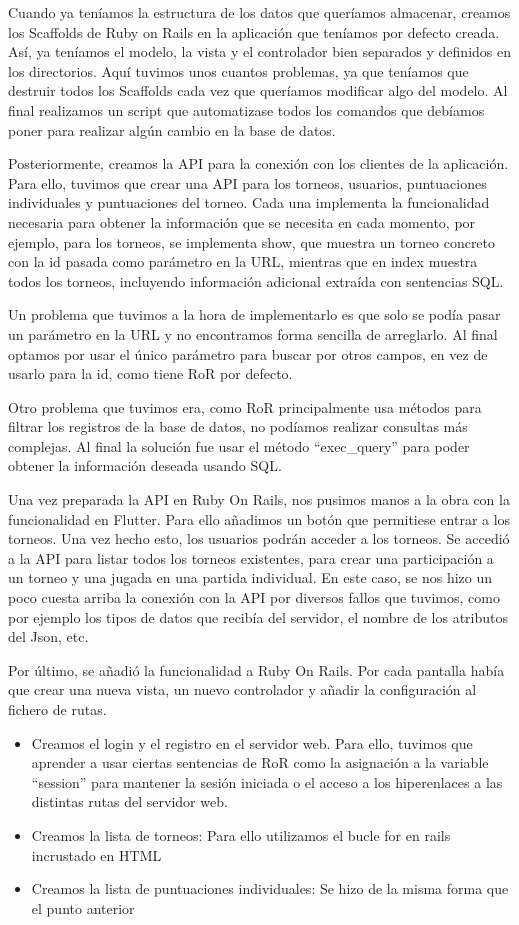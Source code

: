 \documentclass{article}
\begin{document}
Cuando ya teníamos la estructura de los datos que queríamos almacenar, creamos los Scaffolds de Ruby on Rails en la aplicación que teníamos por defecto creada. Así, ya teníamos el 
modelo, la vista y el controlador bien separados y definidos en los directorios. Aquí tuvimos unos cuantos problemas, ya que teníamos que destruir todos los Scaffolds cada vez que queríamos
modificar algo del modelo. Al final realizamos un script que automatizase todos los comandos que debíamos poner para realizar algún cambio en la base de datos.

Posteriormente, creamos la API para la conexión con los clientes de la aplicación. Para ello, tuvimos que crear una API para los torneos, usuarios, puntuaciones individuales y puntuaciones del torneo. Cada una implementa la funcionalidad necesaria para obtener la información que se necesita en cada momento, por ejemplo, para los torneos, se implementa show, que muestra un torneo concreto con la id pasada como parámetro en la URL, mientras que en index muestra todos los torneos, incluyendo información adicional extraída con sentencias SQL. 

Un problema que tuvimos a la hora de implementarlo es que solo se podía pasar un parámetro en la URL y no encontramos forma sencilla de arreglarlo. Al final optamos por usar el único parámetro para buscar por otros campos, en vez de usarlo para la id, como tiene RoR por defecto. 

Otro problema que tuvimos era, como RoR principalmente usa métodos para filtrar los registros de la base de datos, no podíamos realizar consultas más complejas. Al final la solución fue usar el método ``exec\_query'' para poder obtener la información deseada usando SQL.

Una vez preparada la API en Ruby On Rails, nos pusimos manos a la obra con la funcionalidad en Flutter. Para ello añadimos un botón que permitiese entrar a los torneos. Una vez hecho esto, los usuarios
podrán acceder a los torneos. Se accedió a la API para listar todos los torneos existentes, para crear una participación a un torneo y una jugada en una partida individual.
En este caso, se nos hizo un poco cuesta arriba la conexión con la API por diversos fallos que tuvimos, como por ejemplo los tipos de datos que recibía del servidor, el nombre
de los atributos del Json, etc.

Por último, se añadió la funcionalidad a Ruby On Rails. Por cada pantalla había que crear una nueva vista, un nuevo controlador y añadir la configuración al fichero de rutas.
\begin{itemize}
  \item Creamos el login y el registro en el servidor web. Para ello, tuvimos que aprender a usar ciertas sentencias
de RoR como la asignación a la variable ``session'' para mantener la sesión iniciada o el acceso a los hiperenlaces a las distintas rutas del servidor web.  
  \item Creamos la lista de torneos: Para ello utilizamos el bucle for en rails incrustado en HTML
  \item Creamos la lista de puntuaciones individuales: Se hizo de la misma forma que el punto anterior
  \end {itemize}
\end{document}
